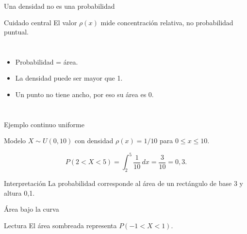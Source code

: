 \documentclass[aspectratio=169,11pt]{beamer}
\begin{document}
\begin{frame}{Una densidad no es una probabilidad}
\begin{alertblock}{Cuidado central}
El valor $\rho(x)$ mide concentración relativa, no probabilidad puntual.
\end{alertblock}
\begin{columns}[T]
\begin{itemize}
  \item Probabilidad = área.
  \item La densidad puede ser mayor que 1.
  \item Un punto no tiene ancho, por eso su área es 0.
\end{itemize}
\end{columns}
\end{frame}

\begin{frame}{Ejemplo continuo uniforme}
\begin{block}{Modelo}
$X\sim U(0,10)$ con densidad $\rho(x)=1/10$ para $0\le x\le10$.
\end{block}
\pause
\[
P(2<X<5)=\int_2^5 \frac{1}{10}\,dx=\frac{3}{10}=0{,}3.
\]
\begin{exampleblock}{Interpretación}
La probabilidad corresponde al área de un rectángulo de base 3 y altura 0,1.
\end{exampleblock}
\end{frame}

\begin{frame}{Área bajo la curva}
\centering
{}
\begin{block}{Lectura}
El área sombreada representa $P(-1<X<1)$.
\end{block}
\end{frame}
\end{document}
